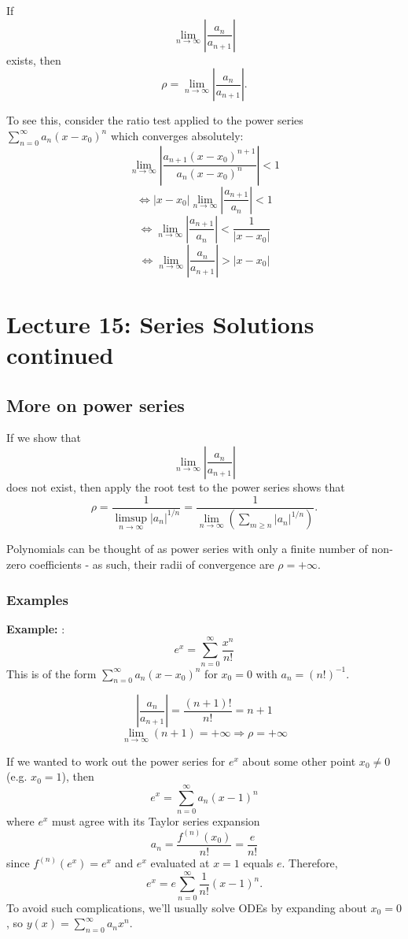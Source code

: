 \documentclass[11pt]{article}
\newcommand{\limseq}{\lim_{n \to \infty}} %
\newcommand{\example}{\textbf{Example: }}
\newcommand{\sumseries}{\sum_{n=0}^{\infty}}
\newcommand{\powerser}{(x - x_0)^n}
\begin{document}
	If
		$$ \limseq \left| \frac{a_n}{a_{n+1}} \right| $$
	exists, then
		$$ \rho = \limseq \left| \frac{a_n}{a_{n+1}} \right|. $$

	To see this, consider the ratio test applied to the power series $\sumseries a_n \powerser$ which converges absolutely:
		$$ \limseq \left| \frac{a_{n+1} (x - x_0)^{n+1}}{a_n \powerser} \right| < 1 $$
		$$ \Leftrightarrow |x-x_0| \limseq \left| \frac{a_{n+1}}{a_n} \right| < 1 $$
		$$ \Leftrightarrow \limseq \left| \frac{a_{n+1}}{a_n} \right| < \frac{1}{|x-x_0|} $$
		$$ \Leftrightarrow \limseq \left| \frac{a_n}{a_{n+1}} \right| > |x-x_0| $$


\section{Lecture 15: Series Solutions continued}
\subsection{More on power series}
	If we show that
		$$ \limseq \left| \frac{a_n}{a_{n+1}} \right| $$
	does not exist, then apply the root test to the power series shows that
		$$ \rho = \frac{1}{\limsup_{n \to \infty} |a_n|^{1/n}} = \frac{1}{\limseq \left( \sum_{m \geq n} |a_n|^{1/n} \right)}. $$

	Polynomials can be thought of as power series with only a finite number of non-zero coefficients - as such, their radii of convergence are $\rho = + \infty$.
\subsubsection{Examples}
	\example:
		$$ e^x = \sumseries \frac{x^n}{n!} $$
	This is of the form $\sumseries a_n \powerser$ for $x_0 = 0$ with $a_n = (n!)^{-1}$.

		$$ \left| \frac{a_n}{a_{n+1}} \right| = \frac{(n+1)!}{n!} = n + 1 $$
		$$ \limseq (n+1) = + \infty \Rightarrow \rho = + \infty $$

	If we wanted to work out the power series for $e^x$ about some other point $x_0 \neq 0$ (e.g. $x_0 = 1$), then
		$$ e^x = \sumseries a_n (x-1)^n $$
	where $e^x$ must agree with its Taylor series expansion
		$$ a_n = \frac{f^{(n)} (x_0)}{n!} = \frac{e}{n!} $$
	since $f^{(n)} (e^x) = e^x$ and $e^x$ evaluated at $x=1$ equals $e$. Therefore,
		$$ e^x = e \sumseries \frac{1}{n!} (x-1)^n .$$
	To avoid such complications, we'll usually solve ODEs by expanding about $x_0 = 0$, so $y(x) = \sumseries a_n x^n$.
\end{document}
